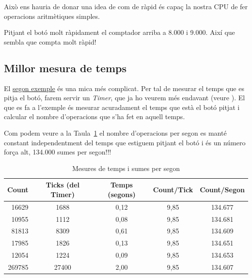 Això ens hauria de donar una idea de com de ràpid és capaç la nostra CPU de fer operacions aritmètiques simples.

Pitjant el botó molt ràpidament el comptador arriba a 8.000 i 9.000. Així que sembla que compta molt ràpid!

\subsection{Millor mesura de temps}
\label{sub:speedtest_example}
El \href{https://github.com/mariusmm/cursembedded/tree/master/Simplicity/SpeedTest_2}{segon exemple} és una mica més complicat. Per tal de mesurar el temps que es pitja el botó, farem servir un {\em Timer}, que ja ho veurem més endavant (veure ). El que es fa a l'exemple és mesurar acuradament el temps que està el botó pitjat i calcular el nombre d'operacions que s'ha fet en aquell temps.

Com podem veure a la Taula~\ref{tb:SpeedTest} el nombre d'operacions per segon es manté constant independentment del temps que estiguem pitjant el botó i és un número força alt, 134.000 sumes per segon!!!

\begin{table}[t!]
\caption{Mesures de temps i sumes per segon}
\centering
\begin{tabular}{|r|c|c|c|c|}
\hline
{\bf Count} & {\bf Ticks (del Timer)} & {\bf Temps (segons)} & {\bf Count/Tick} & {\bf Count/Segon}\\
\hline
16629 & 1688 & 0,12 & 9,85 & 134.677\\
\hline
10955 & 1112	& 0,08 &	9,85	& 134.681\\
\hline
81813 & 8309	& 0,61 &	9,85	& 134.609\\
\hline
17985 & 1826 & 0,13 & 9,85 &134.651 \\
\hline
12054 &1224 & 0,09 & 9,85 & 134.653\\
\hline
269785 &27400 & 2,00 & 9,85 & 134.607\\
\hline
\end{tabular}
\label{tb:SpeedTest}
\end{table}
